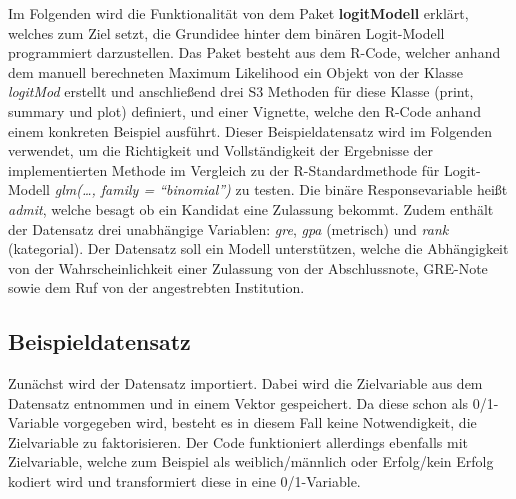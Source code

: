 \documentclass[12pt,]{article}
\newenvironment{Shaded}{\begin{snugshade}}{\end{snugshade}}
\newcommand{\KeywordTok}[1]{\textcolor[rgb]{0.13,0.29,0.53}{\textbf{#1}}}
\newcommand{\DataTypeTok}[1]{\textcolor[rgb]{0.13,0.29,0.53}{#1}}
\newcommand{\DecValTok}[1]{\textcolor[rgb]{0.00,0.00,0.81}{#1}}
\newcommand{\StringTok}[1]{\textcolor[rgb]{0.31,0.60,0.02}{#1}}
\newcommand{\CommentTok}[1]{\textcolor[rgb]{0.56,0.35,0.01}{\textit{#1}}}
\newcommand{\ControlFlowTok}[1]{\textcolor[rgb]{0.13,0.29,0.53}{\textbf{#1}}}
\newcommand{\OperatorTok}[1]{\textcolor[rgb]{0.81,0.36,0.00}{\textbf{#1}}}
\newcommand{\NormalTok}[1]{#1}
\begin{document}
Im Folgenden wird die Funktionalität von dem Paket \textbf{logitModell}
erklärt, welches zum Ziel setzt, die Grundidee hinter dem binären
Logit-Modell programmiert darzustellen. Das Paket besteht aus dem
R-Code, welcher anhand dem manuell berechneten Maximum Likelihood ein
Objekt von der Klasse \emph{logitMod} erstellt und anschließend drei S3
Methoden für diese Klasse (print, summary und plot) definiert, und einer
Vignette, welche den R-Code anhand einem konkreten Beispiel ausführt.
Dieser Beispieldatensatz wird im Folgenden verwendet, um die Richtigkeit
und Vollständigkeit der Ergebnisse der implementierten Methode im
Vergleich zu der R-Standardmethode für Logit-Modell \emph{glm(\ldots{},
family = ``binomial'')} zu testen. Die binäre Responsevariable heißt
\emph{admit}, welche besagt ob ein Kandidat eine Zulassung bekommt.
Zudem enthält der Datensatz drei unabhängige Variablen: \emph{gre},
\emph{gpa} (metrisch) und \emph{rank} (kategorial). Der Datensatz soll
ein Modell unterstützen, welche die Abhängigkeit von der
Wahrscheinlichkeit einer Zulassung von der Abschlussnote, GRE-Note sowie
dem Ruf von der angestrebten Institution.

\subsection{Beispieldatensatz}\label{beispieldatensatz}

Zunächst wird der Datensatz importiert. Dabei wird die Zielvariable aus
dem Datensatz entnommen und in einem Vektor gespeichert. Da diese schon
als 0/1-Variable vorgegeben wird, besteht es in diesem Fall keine
Notwendigkeit, die Zielvariable zu faktorisieren. Der Code funktioniert
allerdings ebenfalls mit Zielvariable, welche zum Beispiel als
weiblich/männlich oder Erfolg/kein Erfolg kodiert wird und transformiert
diese in eine 0/1-Variable.

\begin{Shaded}
\end{Shaded}
\end{document}
